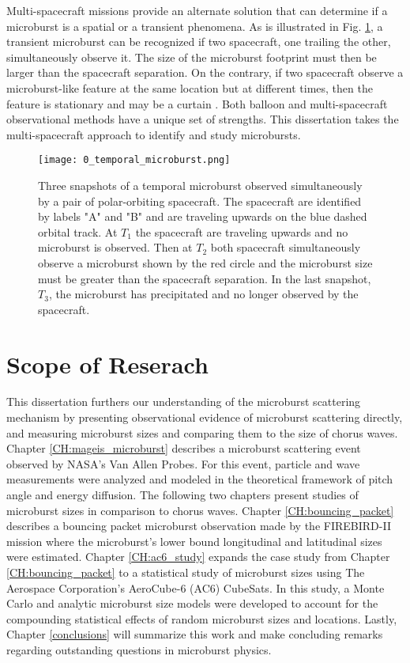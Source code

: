 Multi-spacecraft missions provide an alternate solution that can determine if a microburst is a spatial or a transient phenomena. As is illustrated in Fig. \ref{Intro:temporal_microburst}, a transient microburst can be recognized if two spacecraft, one trailing the other, simultaneously observe it. The size of the microburst footprint must then be larger than the spacecraft separation. On the contrary, if two spacecraft observe a microburst-like feature at the same location but at different times, then the feature is stationary and may be a curtain \citep{Blake2016}. Both balloon and multi-spacecraft observational methods have a unique set of strengths. This dissertation takes the multi-spacecraft approach to identify and study microbursts.

\begin{figure}
\texttt{[image: 0\_temporal\_microburst.png]}
\caption{Three snapshots of a temporal microburst observed simultaneously by a pair of polar-orbiting spacecraft. The spacecraft are identified by labels "A" and "B" and are traveling upwards on the blue dashed orbital track. At $T_1$ the spacecraft are traveling upwards and no microburst is observed. Then at $T_2$ both spacecraft simultaneously observe a microburst shown by the red circle and the microburst size must be greater than the spacecraft separation. In the last snapshot, $T_3$, the microburst has precipitated and no longer observed by the spacecraft.}
\label{Intro:temporal_microburst}
\end{figure}


\section{Scope of Reserach}\label{Intro:scope}
This dissertation furthers our understanding of the microburst scattering mechanism by presenting observational evidence of microburst scattering directly, and measuring microburst sizes and comparing them to the size of chorus waves. Chapter \ref{CH:mageis_microburst} describes a microburst scattering event observed by NASA's Van Allen Probes. For this event, particle and wave measurements were analyzed and modeled in the theoretical framework of pitch angle and energy diffusion. The following two chapters present studies of microburst sizes in comparison to chorus waves. Chapter \ref{CH:bouncing_packet} describes a bouncing packet microburst observation made by the FIREBIRD-II mission where the microburst's lower bound longitudinal and latitudinal sizes were estimated. Chapter \ref{CH:ac6_study} expands the case study from Chapter \ref{CH:bouncing_packet} to a statistical study of microburst sizes using The Aerospace Corporation's AeroCube-6 (AC6) CubeSats. In this study, a Monte Carlo and analytic microburst size models were developed to account for the compounding statistical effects of random microburst sizes and locations. Lastly, Chapter \ref{conclusions} will summarize this work and make concluding remarks regarding outstanding questions in microburst physics.